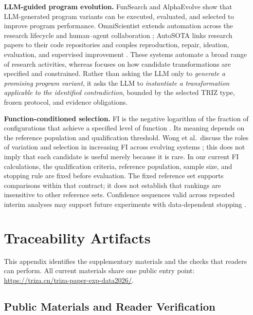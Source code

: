 \documentclass[manuscript,screen,nonacm]{acmart}
\begin{document}
\textbf{LLM-guided program evolution.} FunSearch \citep{romeraparedes2024} and AlphaEvolve \citep{novikov2025} show that LLM-generated program variants can be executed, evaluated, and selected to improve program performance. OmniScientist extends automation across the research lifecycle and human--agent collaboration \citep{shao2025omniscientist}; AutoSOTA links research papers to their code repositories and couples reproduction, repair, ideation, evaluation, and supervised improvement \citep{li2026autosota}. These systems automate a broad range of research activities, whereas \triza{} focuses on how candidate transformations are specified and constrained. Rather than asking the LLM only to \emph{generate a promising program variant}, it asks the LLM to \emph{instantiate a transformation applicable to the identified contradiction}, bounded by the selected TRIZ type, frozen protocol, and evidence obligations.

\textbf{Function-conditioned selection.} FI is the negative logarithm of the fraction of configurations that achieve a specified level of function \citep{hazen2007}. Its meaning depends on the reference population and qualification threshold. Wong et al.\ discuss the roles of variation and selection in increasing FI across evolving systems \citep{wong2023}; this does not imply that each candidate is useful merely because it is rare. In our current FI calculations, the qualification criteria, reference population, sample size, and stopping rule are fixed before evaluation. The fixed reference set supports comparisons within that contract; it does not establish that rankings are insensitive to other reference sets. Confidence sequences valid across repeated interim analyses may support future experiments with data-dependent stopping \citep{howard2021}.

\section{Traceability Artifacts}
\label{app:traceability}

This appendix identifies the supplementary materials and the checks that readers
can perform. All current materials share one public entry point:
\url{https://triza.cn/triza-paper-exp-data2026/}.

\subsection{Public Materials and Reader Verification}
\end{document}
